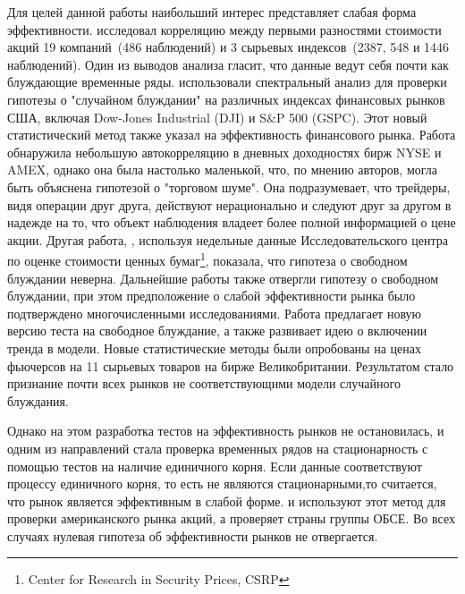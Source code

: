 \documentclass[a4paper,12pt]{article}
\begin{document}
Для целей данной работы наибольший интерес представляет слабая форма эффективности. \cite{Kendall1953} исследовал корреляцию между первыми разностями стоимости акций 19 компаний~(486 наблюдений) и 3 сырьевых индексов~(2387, 548 и 1446 наблюдений). Один из выводов анализа гласит, что данные ведут себя почти как блуждающие временные ряды. \cite{Granger1963} использовали спектральный анализ для проверки гипотезы о "случайном блуждании" на различных индексах финансовых рынков США, включая Dow-Jones Industrial (DJI) и S$\&$P 500 (GSPC). Этот новый статистический метод также указал на эффективность финансового рынка. Работа \cite{French1986} обнаружила небольшую автокорреляцию в дневных доходностях бирж NYSE и AMEX, однако она была настолько маленькой, что, по мнению авторов, могла быть объяснена гипотезой о "торговом шуме". Она подразумевает, что трейдеры, видя операции друг друга, действуют нерационально и следуют друг за другом в надежде на то, что объект наблюдения владеет более полной информацией о цене акции. Другая работа, \cite{Lo1987}, используя недельные данные Исследовательского центра по оценке стоимости ценных бумаг\footnote{Center for Research in Security Prices, CSRP}, показала, что гипотеза о свободном блуждании неверна. Дальнейшие работы также отвергли гипотезу о свободном блуждании, при этом предположение о слабой эффективности рынка было подтверждено многочисленными исследованиями. Работа \cite{Taylor1982} предлагает новую версию теста на свободное блуждание, а также развивает идею о включении тренда в модели. Новые статистические методы были опробованы на ценах фьючерсов на 11 сырьевых товаров на бирже Великобритании. Результатом стало признание почти всех рынков не соответствующими модели случайного блуждания.

Однако на этом разработка тестов на эффективность рынков не остановилась, и одним из направлений стала проверка временных рядов на стационарность с помощью тестов на наличие единичного корня. Если данные соответствуют процессу единичного корня, то есть не являются стационарными,то считается, что рынок является эффективным в слабой форме. \cite{Narayan2006} и \cite{Lee2003} используют этот метод для проверки американского рынка акций, а \cite{Narayan2005} проверяет страны группы ОБСЕ. Во всех случаях нулевая гипотеза об эффективности рынков не отвергается.
\end{document}
